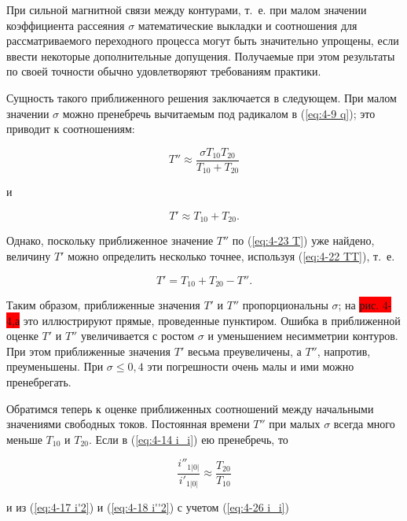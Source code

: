 При сильной магнитной связи между контурами, т.~е. при малом значении коэффициента рассеяния $ \sigma $ математические выкладки и соотношения для рассматриваемого переходного процесса могут быть значительно упрощены, если ввести некоторые дополнительные допущения. Получаемые при этом результаты по своей точности обычно удовлетворяют требованиям практики.

Сущность такого приближенного решения заключается в следующем. При малом значении $ \sigma $  можно пренебречь вычитаемым под радикалом в (\ref{eq:4-9 q}); это приводит к соотношениям:

\begin{equation}
    \label{eq:4-23 T}
    T'' \approx \frac{\sigma T_{10}T_{20}}{T_{10}+T_{20}} 
\end{equation}

и

\begin{equation}
    \label{eq:4-24 T}
    T' \approx T_{10} + T_{20} \text{.}
\end{equation}

Однако, поскольку приближенное значение $ T'' $ по (\ref{eq:4-23 T}) уже найдено, величину $ T' $ можно определить несколько точнее, используя (\ref{eq:4-22 TT}), т.~е.

\begin{equation}
    \label{eq:4-25 T}
    T' = T_{10} + T_{20} - T'' \text{.}
\end{equation}

Таким образом, приближенные значения $ T' $  и $ T'' $ пропорциональны $ \sigma $; на \colorbox{red}{рис. 4-4,а} это иллюстрируют прямые, проведенные пунктиром. Ошибка в приближенной оценке $ T' $  и $ T'' $ увеличивается с ростом $ \sigma $ и уменьшением несимметрии контуров. При этом приближенные значения $ T' $ весьма преувеличены, а $ T'' $, напротив, преуменьшены. При $ \sigma \leqslant 0,4 $ эти погрешности очень малы и ими можно пренебрегать.

Обратимся теперь к оценке приближенных соотношений между начальными значениями свободных токов. Постоянная времени $ T'' $ при малых $ \sigma $ всегда много меньше $ T_{10} $ и $ T_{20} $. Если в (\ref{eq:4-14 i_i}) ею пренебречь, то 

\begin{equation}
    \label{eq:4-26 i_i}
    \frac{i''_{1|0|}}{i'_{1|0|}} \approx \frac{T_{20}}{T_{10}}
\end{equation}

и из (\ref{eq:4-17 i'2}) и (\ref{eq:4-18 i''2}) с учетом (\ref{eq:4-26 i_i})

